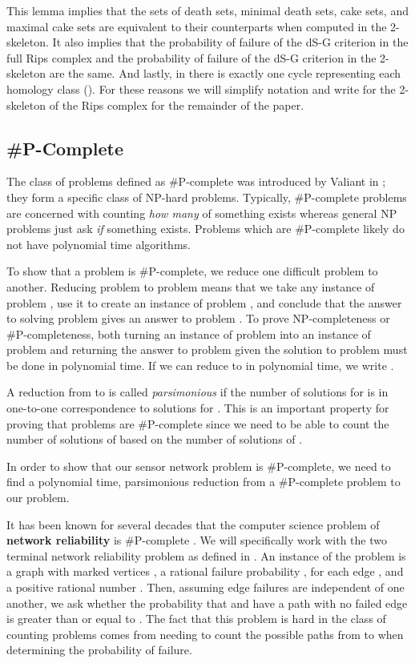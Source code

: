 \documentclass[10pt,twocolumn]{article} \usepackage{amsmath,epsf,amssymb,cite,pifont,amsthm, mathrsfs,epsfig,  bbm, amsthm,  setspace}
\renewcommand{\1}{\mathbbm{1}}
\begin{document}
This lemma implies that the sets of death sets, minimal death sets, cake sets,  and maximal cake sets are equivalent
to their counterparts when computed in the 2-skeleton.
It also implies that the probability of failure of the dS-G criterion in the full Rips complex
and the probability of failure of the dS-G criterion in the 2-skeleton are the same.
And lastly, in  there is exactly one cycle representing each homology class ().
For these reasons we will simplify notation and write 
for the 2-skeleton of the Rips complex for the remainder of the paper.






\subsection{\#P-Complete}\label{S: SharpP-Complete}

The class of problems defined as \#P-complete was introduced by Valiant in \cite{Valiant};
they form a specific class of NP-hard problems.
Typically, \#P-complete problems are concerned with counting \textit{how many} of something
exists  whereas general NP problems just ask \textit{if} something exists.
Problems which are \#P-complete likely do not have polynomial time algorithms.

To show that a problem is \#P-complete, we reduce one difficult problem to another.
Reducing problem  to problem  means that we take any instance of problem ,
use it to create an instance of problem , and conclude that the answer to solving problem 
gives an answer to problem .
To prove NP-completeness or \#P-completeness,
both turning an instance of problem  into an instance of problem 
and returning the answer to problem  given the solution to problem  must
be done in polynomial time.
If we can reduce  to  in polynomial time,  we write .

A reduction from  to  is called \textit{parsimonious} if the number of solutions for 
is in one-to-one correspondence to solutions for .
This is an important property for proving that problems are \#P-complete since we need to be
able to count the number of solutions of  based on the number of solutions of .

In order to show that our sensor network problem is \#P-complete,
we need to find a polynomial time, parsimonious reduction from a \#P-complete problem to our problem.


It has been known for several decades that the computer science problem of {\bf network reliability}
is \#P-complete \cite{Garey1979,Colbourn1987}.
We will specifically work with the two terminal network reliability problem as defined in \cite{Garey1979}.
An instance of the problem is a graph  with marked vertices ,
a rational failure probability ,  for each edge ,
and a positive rational number .
Then, assuming edge failures are independent of one another,
we ask whether the probability that  and  have a path with no failed edge
is greater than or equal to .
The fact that this problem is hard in the class of counting problems comes from needing to count the possible paths from  to  when determining the probability of failure.
\end{document}
